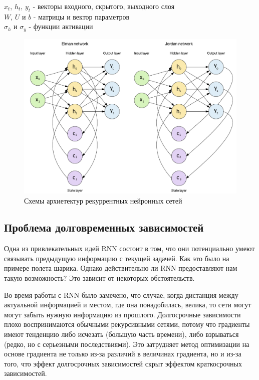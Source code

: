 	\begin{tabbing}
		$x_t$, $h_t$, $y_t$  - векторы входного, скрытого, выходного слоя        \\
		$W$, $U$ и $b$ - матрицы и вектор параметров       \\
		$\sigma_h$ и $\sigma_y$ - функции активации
	\end{tabbing}
	
	\begin{figure}[ht!]
		\centering
		\captionsetup{justification=centering}
		\includegraphics[width=140mm]{img/RNN.png}
		\caption{Схемы архиетектур рекуррентных нейронных сетей}
	\end{figure}
	
	\subsection{Проблема долговременных зависимостей}
	
	Одна из привлекательных идей RNN состоит в том, что они потенциально умеют связывать предыдущую информацию с текущей задачей. Как это было на примере полета шарика. Однако действительно ли RNN предоставляют нам такую возможность? Это зависит от некоторых обстоятельств.

	Во время работы с RNN было замечено, что случае, когда дистанция между актуальной информацией и местом, где она понадобилась, велика, то сети могут могут забыть нужную информацию из прошлого. Долгосрочные зависимости плохо воспринимаются обычными рекурсивными сетями, потому что градиенты имеют тенденцию либо исчезать (большую часть времени), либо взрываться (редко, но с серьезными последствиями). Это затрудняет метод оптимизации на основе градиента не только из-за различий в величинах градиента, но и из-за того, что эффект долгосрочных зависимостей скрыт эффектом краткосрочных зависимостей. 
	
